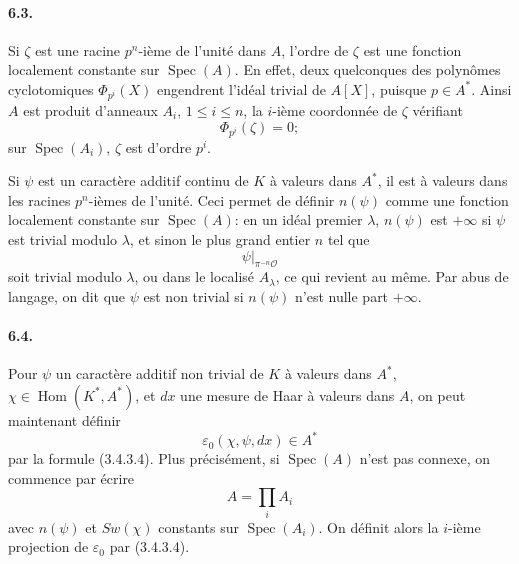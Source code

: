 \documentclass[10pt]{article}
\newcommand{\Hom}{\operatorname{Hom}}
\newcommand{\Spec}{\operatorname{Spec}}
\providecommand{\Spec}{\operatorname{Spec}}
\providecommand{\Hom}{\operatorname{Hom}}
\providecommand{\Hom}{\operatorname{Hom}}
\providecommand{\Spec}{\operatorname{Spec}}
\providecommand{\Spec}{\operatorname{Spec}}
\providecommand{\Hom}{\operatorname{Hom}}
\begin{document}
\paragraph{6.3.} Si \(\zeta\) est une racine \(p^n\)-ième de l'unité dans \(A\), l'ordre de \(\zeta\) est une fonction localement constante sur \(\Spec(A)\). En effet, deux quelconques des polynômes cyclotomiques \(\Phi_{p^i}(X)\) engendrent l'idéal trivial de \(A[X]\), puisque \(p\in A^*\). Ainsi \(A\) est produit d'anneaux \(A_i\), \(1\le i\le n\), la \(i\)-ième coordonnée de \(\zeta\) vérifiant
\[
\Phi_{p^i}(\zeta)=0;
\]
sur \(\Spec(A_i)\), \(\zeta\) est d'ordre \(p^i\).

Si \(\psi\) est un caractère additif continu de \(K\) à valeurs dans \(A^*\), il est à valeurs dans les racines \(p^n\)-ièmes de l'unité. Ceci permet de définir \(n(\psi)\) comme une fonction localement constante sur \(\Spec(A)\): en un idéal premier \(\lambda\), \(n(\psi)\) est \(+\infty\) si \(\psi\) est trivial modulo \(\lambda\), et sinon le plus grand entier \(n\) tel que
\[
\psi|_{\pi^{-n}\mathcal O}
\]
soit trivial modulo \(\lambda\), ou dans le localisé \(A_\lambda\), ce qui revient au même. Par abus de langage, on dit que \(\psi\) est non trivial si \(n(\psi)\) n'est nulle part \(+\infty\).

\paragraph{6.4.} Pour \(\psi\) un caractère additif non trivial de \(K\) à valeurs dans \(A^*\), \(\chi\in\Hom(K^*,A^*)\), et \(dx\) une mesure de Haar à valeurs dans \(A\), on peut maintenant définir
\[
\varepsilon_0(\chi,\psi,dx)\in A^*
\]
par la formule (3.4.3.4). Plus précisément, si \(\Spec(A)\) n'est pas connexe, on commence par écrire
\[
A=\prod_i A_i
\]
avec \(n(\psi)\) et \(Sw(\chi)\) constants sur \(\Spec(A_i)\). On définit alors la \(i\)-ième projection de \(\varepsilon_0\) par (3.4.3.4).
\end{document}
